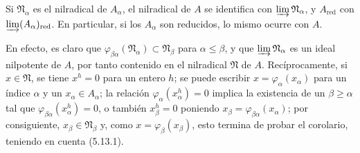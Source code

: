 \begin{corollary}[5.13.2]
\label{IV.2.s5.13.2-fr}
Si $\mathfrak N_\alpha$ es el nilradical de $A_\alpha$, el nilradical de $A$
se identifica con $\varinjlim\mathfrak N_\alpha$, y $A_{\mathrm{red}}$ con
$\varinjlim(A_\alpha)_{\mathrm{red}}$. En particular, si los $A_\alpha$ son
reducidos, lo mismo ocurre con $A$.
\end{corollary}


En efecto, es claro que
$\varphi_{\beta\alpha}(\mathfrak N_\alpha)\subset\mathfrak N_\beta$ para
$\alpha\leq\beta$, y que $\varinjlim\mathfrak N_\alpha$ es un ideal
nilpotente de $A$, por tanto contenido en el nilradical $\mathfrak N$ de $A$.
Recíprocamente, si $x\in\mathfrak N$, se tiene $x^h=0$ para un entero $h$; se
puede escribir $x=\varphi_\alpha(x_\alpha)$ para un índice $\alpha$ y un
$x_\alpha\in A_\alpha$; la relación
$\varphi_\alpha(x_\alpha^h)=0$ implica la existencia de un
$\beta\geq\alpha$ tal que
$\varphi_{\beta\alpha}(x_\alpha^h)=0$, o también $x_\beta^h=0$ poniendo
$x_\beta=\varphi_{\beta\alpha}(x_\alpha)$; por consiguiente,
$x_\beta\in\mathfrak N_\beta$ y, como $x=\varphi_\beta(x_\beta)$, esto
termina de probar el corolario, teniendo en cuenta (5.13.1).
